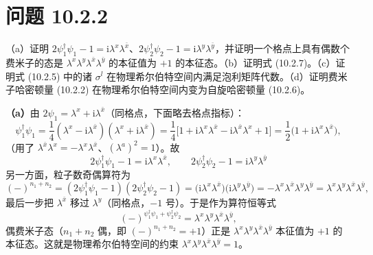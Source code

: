 \section*{问题 10.2.2}
\begin{problem}
（a）证明 $2\psi_1^\dagger\psi_1-1=\mathrm{i}\lambda^{x}\lambda^{\bar{x}}$、$2\psi_2^\dagger\psi_2-1=\mathrm{i}\lambda^{y}\lambda^{\bar{y}}$，并证明一个格点上具有偶数个费米子的态是 $\lambda^{x}\lambda^{y}\lambda^{\bar{x}}\lambda^{\bar{y}}$ 的本征值为 $+1$ 的本征态。（b）证明式 (10.2.7)。（c）证明式 (10.2.5) 中的诸 $\sigma^{l}$ 在物理希尔伯特空间内满足泡利矩阵代数。（d）证明费米子哈密顿量 (10.2.2) 在物理希尔伯特空间内变为自旋哈密顿量 (10.2.6)。
\end{problem}
\solution
\textbf{（a）}由 $2\psi_1=\lambda^{x}+\mathrm{i}\lambda^{\bar{x}}$（同格点，下面略去格点指标）：
\begin{equation*}
\psi_1^\dagger\psi_1=\frac14(\lambda^{x}-\mathrm{i}\lambda^{\bar{x}})(\lambda^{x}+\mathrm{i}\lambda^{\bar{x}})
=\frac14\big[1+\mathrm{i}\lambda^{x}\lambda^{\bar{x}}-\mathrm{i}\lambda^{\bar{x}}\lambda^{x}+1\big]
=\frac12\big(1+\mathrm{i}\lambda^{x}\lambda^{\bar{x}}\big),
\end{equation*}
（用了 $\lambda^{\bar{x}}\lambda^{x}=-\lambda^{x}\lambda^{\bar{x}}$、$(\lambda^{a})^2=1$）。故
\begin{equation*}
\boxed{\;2\psi_1^\dagger\psi_1-1=\mathrm{i}\lambda^{x}\lambda^{\bar{x}},\qquad 2\psi_2^\dagger\psi_2-1=\mathrm{i}\lambda^{y}\lambda^{\bar{y}}\;}
\end{equation*}
另一方面，粒子数奇偶算符为
\begin{equation*}
(-)^{n_1+n_2}=(2\psi_1^\dagger\psi_1-1)(2\psi_2^\dagger\psi_2-1)
=\big(\mathrm{i}\lambda^{x}\lambda^{\bar{x}}\big)\big(\mathrm{i}\lambda^{y}\lambda^{\bar{y}}\big)
=-\lambda^{x}\lambda^{\bar{x}}\lambda^{y}\lambda^{\bar{y}}
=\lambda^{x}\lambda^{y}\lambda^{\bar{x}}\lambda^{\bar{y}},
\end{equation*}
最后一步把 $\lambda^{\bar x}$ 移过 $\lambda^{y}$（同格点，$-1$ 号）。于是作为算符恒等式
\begin{equation*}
(-)^{\psi_1^\dagger\psi_1+\psi_2^\dagger\psi_2}=\lambda^{x}\lambda^{y}\lambda^{\bar{x}}\lambda^{\bar{y}},
\end{equation*}
偶费米子态（$n_1+n_2$ 偶，即 $(-)^{n_1+n_2}=+1$）正是 $\lambda^{x}\lambda^{y}\lambda^{\bar{x}}\lambda^{\bar{y}}$ 本征值为 $+1$ 的本征态。这就是物理希尔伯特空间的约束 $\lambda^{x}\lambda^{y}\lambda^{\bar{x}}\lambda^{\bar{y}}=1$。

